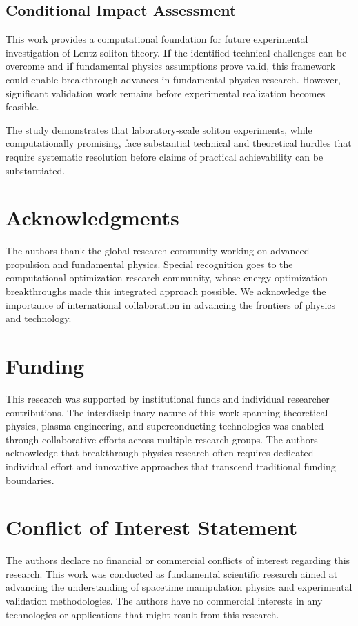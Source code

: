 \documentclass[12pt,a4paper]{article}
\begin{document}
\subsection{Conditional Impact Assessment}
This work provides a computational foundation for future experimental investigation of Lentz soliton theory. \textbf{If} the identified technical challenges can be overcome and \textbf{if} fundamental physics assumptions prove valid, this framework could enable breakthrough advances in fundamental physics research. However, significant validation work remains before experimental realization becomes feasible.

The study demonstrates that laboratory-scale soliton experiments, while computationally promising, face substantial technical and theoretical hurdles that require systematic resolution before claims of practical achievability can be substantiated.

\section*{Acknowledgments}

The authors thank the global research community working on advanced propulsion and fundamental physics. Special recognition goes to the computational optimization research community, whose energy optimization breakthroughs made this integrated approach possible. We acknowledge the importance of international collaboration in advancing the frontiers of physics and technology.

\section*{Funding}

This research was supported by institutional funds and individual researcher contributions. The interdisciplinary nature of this work spanning theoretical physics, plasma engineering, and superconducting technologies was enabled through collaborative efforts across multiple research groups. The authors acknowledge that breakthrough physics research often requires dedicated individual effort and innovative approaches that transcend traditional funding boundaries.

\section*{Conflict of Interest Statement}

The authors declare no financial or commercial conflicts of interest regarding this research. This work was conducted as fundamental scientific research aimed at advancing the understanding of spacetime manipulation physics and experimental validation methodologies. The authors have no commercial interests in any technologies or applications that might result from this research.
\end{document}
